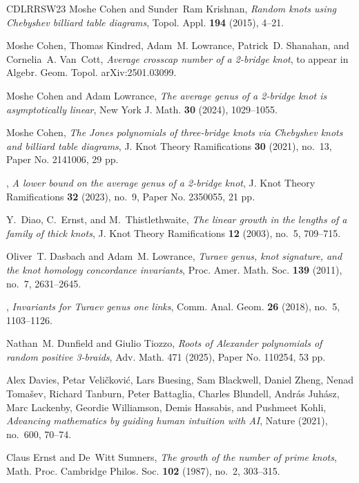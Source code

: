 \documentclass[12pt]{amsart}
\theoremstyle{definition}
\theoremstyle{remark}
\numberwithin{equation}{section}
\begin{document}
\begin{thebibliography}{CDLRRSW23}
Moshe Cohen and Sunder~Ram Krishnan, \emph{Random knots using {C}hebyshev
  billiard table diagrams}, Topol. Appl. \textbf{194} (2015), 4--21.

Moshe Cohen, Thomas Kindred, Adam~M. Lowrance, Patrick~D. Shanahan, and
  Cornelia~A. Van~Cott, \emph{Average crosscap number of a 2-bridge knot}, to appear in Algebr. Geom. Topol. arXiv:2501.03099.

Moshe Cohen and Adam Lowrance, \emph{The average genus of a 2-bridge knot is
  asymptotically linear}, New York J. Math. \textbf{30} (2024), 1029--1055.

Moshe Cohen, \emph{The {J}ones polynomials of three-bridge knots via
  {C}hebyshev knots and billiard table diagrams}, J. Knot Theory Ramifications
  \textbf{30} (2021), no.~13, Paper No. 2141006, 29 pp.

\bysame, \emph{A lower bound on the average genus of a 2-bridge knot}, J. Knot
  Theory Ramifications \textbf{32} (2023), no.~9, Paper No. 2350055, 21 pp.

Y.~Diao, C.~Ernst, and M.~Thistlethwaite, \emph{The linear growth in the
  lengths of a family of thick knots}, J. Knot Theory Ramifications \textbf{12}
  (2003), no.~5, 709--715.

Oliver~T. Dasbach and Adam~M. Lowrance, \emph{Turaev genus, knot signature, and
  the knot homology concordance invariants}, Proc. Amer. Math. Soc.
  \textbf{139} (2011), no.~7, 2631--2645.

\bysame, \emph{Invariants for {T}uraev genus one links}, Comm. Anal. Geom.
  \textbf{26} (2018), no.~5, 1103--1126.

Nathan~M. Dunfield and Giulio Tiozzo, \emph{Roots of {A}lexander polynomials of random positive 3-braids},
Adv. Math. 471 (2025), Paper No. 110254, 53 pp.

Alex Davies, Petar Veli\v{c}kovi\'{c}, Lars Buesing, Sam Blackwell, Daniel Zheng,
  Nenad Toma\v{s}ev, Richard Tanburn, Peter Battaglia, Charles Blundell, Andr\'as
  Juh\'asz, Marc Lackenby, Geordie Williamson, Demis Hassabis, and Pushmeet
  Kohli, \emph{Advancing mathematics by guiding human intuition with {AI}},
  Nature (2021), no.~600, 70--74.

Claus Ernst and De~Witt Sumners, \emph{The growth of the number of prime
  knots}, Math. Proc. Cambridge Philos. Soc. \textbf{102} (1987), no.~2,
  303--315.


\end{thebibliography}
\end{document}
